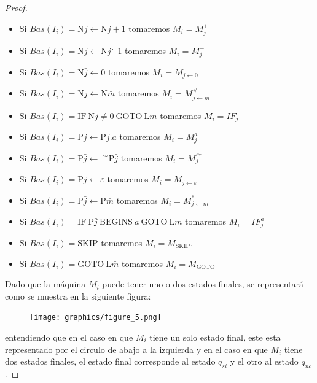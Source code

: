 \begin{proof}
		\begin{itemize}
			\item Si $Bas(I_{i})=\mathrm{N}\bar{j} \leftarrow \mathrm{N}\bar{j} + 1$ tomaremos $M_{i} = M_{j}^{+}$
	    \item Si $Bas(I_{i})=\mathrm{N}\bar{j} \leftarrow \mathrm{N}\bar{j} \dot{-} 1 $ tomaremos $M_{i} =
        M_{j}^{\dot{-}}$
	    \item Si $Bas(I_{i})=\mathrm{N}\bar{j} \leftarrow 0$ tomaremos $M_{i} = M_{j \leftarrow 0}$
	    \item Si $Bas(I_{i})=\mathrm{N}\bar{j} \leftarrow \mathrm{N}\bar{m}$ tomaremos $M_{i} = M_{j \leftarrow m}^{\#}$
	    \item Si $Bas(I_{i})=\mathrm{IF} \ \mathrm{N}\bar{j} \not = 0 \ \mathrm{GOTO} \ \mathrm{L}\bar{m}$ tomaremos
        $M_{i} = IF_{j}$
	    \item Si $Bas(I_{i})=\mathrm{P}\bar{j} \leftarrow \mathrm{P}\bar{j}.a$ tomaremos $M_{i}=M_{j}^{a}$
	    \item Si $Bas(I_{i})=\mathrm{P}\bar{j} \leftarrow \ ^{\curvearrowright} \mathrm{P}\bar{j}$ tomaremos $M_{i} =
        M_{j}^{\curvearrowright}$
	    \item Si $Bas(I_{i})=\mathrm{P}\bar{j} \leftarrow \varepsilon$ tomaremos $M_{i} = M_{j\leftarrow \varepsilon}$
	    \item Si $Bas(I_{i})=\mathrm{P}\bar{j} \leftarrow \mathrm{P}\bar{m}$ tomaremos $M_{i} = M_{j \leftarrow m}^{\ast}$
	    \item Si $Bas(I_{i})=\mathrm{IF} \ \mathrm{P}\bar{j} \ \mathrm{BEGINS} \ a \ \mathrm{GOTO} \ \mathrm{L}\bar{m}$
        tomaremos $M_{i} = IF_{j}^{a}$
	    \item Si $Bas(I_{i})=\mathrm{SKIP}$ tomaremos $M_{i} = M_{\mathrm{SKIP}}$.
	    \item Si $Bas(I_{i})=\mathrm{GOTO} \ \mathrm{L}\bar{m}$ tomaremos $M_{i} = M_{\mathrm{GOTO}}$
		\end{itemize}

    \PN Dado que la máquina $M_{i}$ puede tener uno o dos estados finales, se representará como se muestra en la
    siguiente figura:

    \begin{figure}[h]
      \centering
      \texttt{[image: graphics/figure\_5.png]}
    \end{figure}

    \PN entendiendo que en el caso en que $M_{i}$ tiene un solo estado final, este esta representado por el circulo de
    abajo a la izquierda y en el caso en que $M_{i}$ tiene dos estados finales, el estado final corresponde al estado
    $q_{si}$ y el otro al estado $q_{no}$.


\end{proof}
